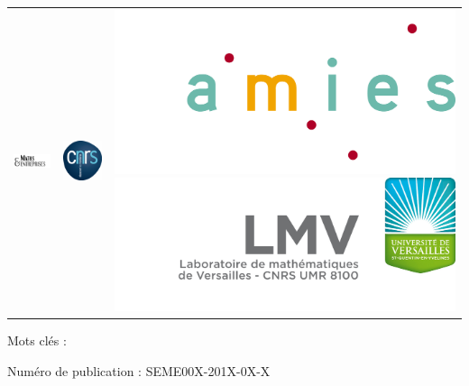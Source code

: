 \documentclass[a4paper,11pt]{article}
\numberwithin{section}{part}
\begin{document}
\begin{center}
\begin{tabular}{ccc}
\includegraphics[scale=0.9]{logo_GDR_ME}&
\includegraphics[scale=1.0]{logo_CNRS}&
\includegraphics[scale=0.05]{logo_AMIES}
\includegraphics[scale=0.4]{logo_LMV}
\end{tabular}
\end{center}

\newpage
 \setcounter{page}{0}
\thispagestyle{empty}
\begin{center}

\vfill
Mots clés :

\vfill
Num\'ero de publication : SEME00X-201X-0X-X
\end{center}
\newpage
\end{document}
